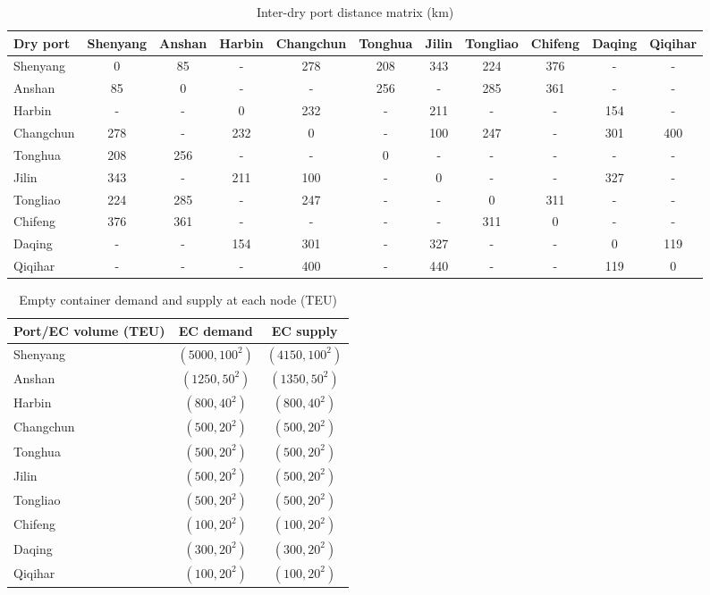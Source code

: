 \documentclass[preprint,12pt]{elsarticle}
\begin{document}
\begin{table}
\centering
\caption{Inter-dry port distance matrix (km)}
\label{tab:inter_dryport_distance}
\small
\setlength{\tabcolsep}{4pt}
\begin{tabular}{l*{10}{c}}
\hline
Dry port & Shenyang & Anshan & Harbin & Changchun & Tonghua & Jilin & Tongliao & Chifeng & Daqing & Qiqihar \\
\hline
Shenyang & 0 & 85 & - & 278 & 208 & 343 & 224 & 376 & - & - \\
Anshan & 85 & 0 & - & - & 256 & - & 285 & 361 & - & - \\
Harbin & - & - & 0 & 232 & - & 211 & - & - & 154 & - \\
Changchun & 278 & - & 232 & 0 & - & 100 & 247 & - & 301 & 400 \\
Tonghua & 208 & 256 & - & - & 0 & - & - & - & - & - \\
Jilin & 343 & - & 211 & 100 & - & 0 & - & - & 327 & - \\
Tongliao & 224 & 285 & - & 247 & - & - & 0 & 311 & - & - \\
Chifeng & 376 & 361 & - & - & - & - & 311 & 0 & - & - \\
Daqing & - & - & 154 & 301 & - & 327 & - & - & 0 & 119 \\
Qiqihar & - & - & - & 400 & - & 440 & - & - & 119 & 0 \\
\hline
\end{tabular}
\end{table}

\begin{table}[htbp]
\centering
\caption{Empty container demand and supply at each node (TEU)}
\label{tab:ec_demand_supply}
\begin{tabular}{lcc}
\hline
Port/EC volume (TEU) & EC demand & EC supply \\
\hline
Shenyang & $(5000, 100^2)$ & $(4150, 100^2)$ \\
Anshan & $(1250, 50^2)$ & $(1350, 50^2)$ \\
Harbin & $(800, 40^2)$ & $(800, 40^2)$ \\
Changchun & $(500, 20^2)$ & $(500, 20^2)$ \\
Tonghua & $(500, 20^2)$ & $(500, 20^2)$ \\
Jilin & $(500, 20^2)$ & $(500, 20^2)$ \\
Tongliao & $(500, 20^2)$ & $(500, 20^2)$ \\
Chifeng & $(100, 20^2)$ & $(100, 20^2)$ \\
Daqing & $(300, 20^2)$ & $(300, 20^2)$ \\
Qiqihar & $(100, 20^2)$ & $(100, 20^2)$ \\
\hline
\end{tabular}
\end{table}
\clearpage
\end{document}
